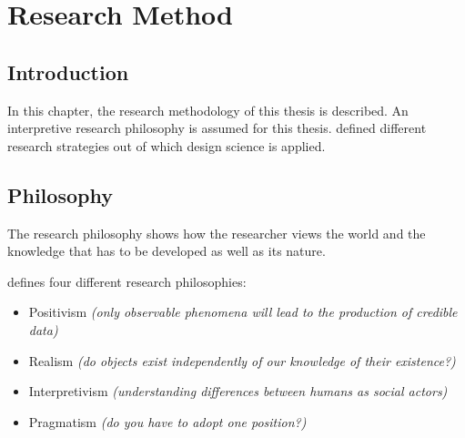 
\chapter{Research Method} %

\label{Research Method} %


\section{Introduction}

In this chapter, the research methodology of this thesis is described. An interpretive research philosophy is assumed for this thesis. \cite{Hevner2010} defined different research strategies out of which design science is applied.



\section{Philosophy}

The research philosophy shows how the researcher views the world and the knowledge that has to be developed as well as its nature.

\cite{Saunders2009} defines four different research philosophies:
\begin{itemize}[noitemsep,nolistsep]
	\item Positivism \textit{(only observable phenomena will lead
		to the production of credible data)}
	\item Realism \textit{(do objects exist independently of our
		knowledge of their existence?)}
	\item Interpretivism \textit{(understanding differences 
		between humans as social actors)}
	\item Pragmatism \textit{(do you have to adopt one position?)}
\end{itemize}

